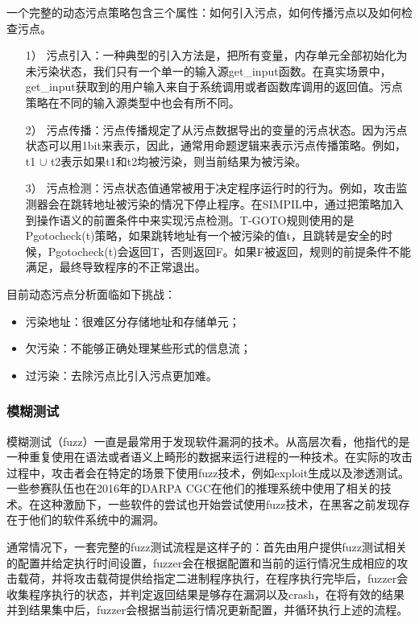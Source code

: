 \documentclass[doctor,privacy,twoside]{buaa_mac}
\begin{document}
一个完整的动态污点策略包含三个属性：如何引入污点，如何传播污点以及如何检查污点。
\begin{itemize}
\item[1）] 污点引入：一种典型的引入方法是，把所有变量，内存单元全部初始化为未污染状态，我们只有一个单一的输入源get\_{}input函数。在真实场景中，get\_{}input获取到的用户输入来自于系统调用或者函数库调用的返回值。污点策略在不同的输入源类型中也会有所不同。
\item[2）] 污点传播：污点传播规定了从污点数据导出的变量的污点状态。因为污点状态可以用1bit来表示，因此，通常用命题逻辑来表示污点传播策略。例如，t1 $\cup$ t2表示如果t1和t2均被污染，则当前结果为被污染。
\item[3）] 污点检测：污点状态值通常被用于决定程序运行时的行为。例如，攻击监测器会在跳转地址被污染的情况下停止程序。在SIMPIL中，通过把策略加入到操作语义的前置条件中来实现污点检测。T-GOTO规则使用的是Pgotocheck(t)策略，如果跳转地址有一个被污染的值t，且跳转是安全的时候，Pgotocheck(t)会返回T，否则返回F。如果F被返回，规则的前提条件不能满足，最终导致程序的不正常退出。
\end{itemize}

目前动态污点分析面临如下挑战：
\begin{itemize}
\item 污染地址：很难区分存储地址和存储单元；
\item 欠污染：不能够正确处理某些形式的信息流；
\item 过污染：去除污点比引入污点更加难。
\end{itemize}


\subsubsection{模糊测试}

模糊测试（fuzz）一直是最常用于发现软件漏洞的技术。从高层次看，他指代的是一种重复使用在语法或者语义上畸形的数据来运行进程的一种技术。在实际的攻击过程中，攻击者会在特定的场景下使用fuzz技术，例如exploit生成以及渗透测试。一些参赛队伍也在2016年的DARPA CGC在他们的推理系统中使用了相关的技术。在这种激励下，一些软件的尝试也开始尝试使用fuzz技术，在黑客之前发现存在于他们的软件系统中的漏洞。

通常情况下，一套完整的fuzz测试流程是这样子的：首先由用户提供fuzz测试相关的配置并给定执行时间设置，fuzzer会在根据配置和当前的运行情况生成相应的攻击载荷，并将攻击载荷提供给指定二进制程序执行，在程序执行完毕后，fuzzer会收集程序执行的状态，并判定返回结果是够存在漏洞以及crash，在将有效的结果并到结果集中后，fuzzer会根据当前运行情况更新配置，并循环执行上述的流程。
\end{document}
